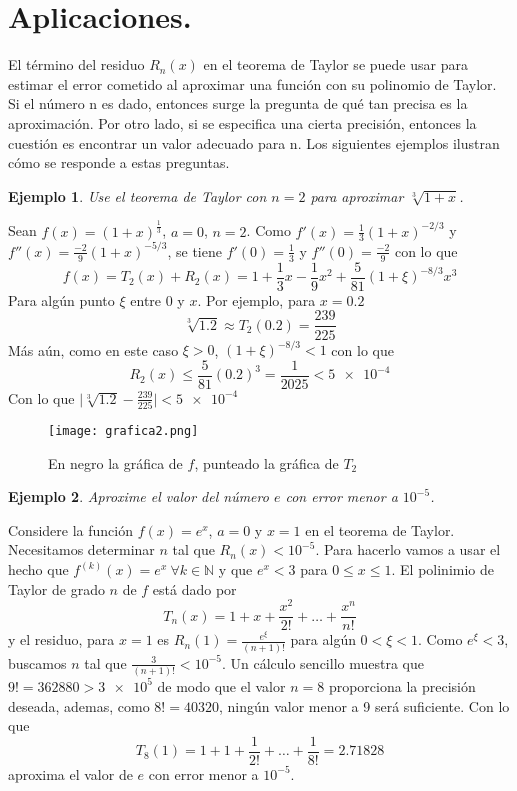 \documentclass[12pt]{book}
\newcommand\N{{\mathbb N}}
\providecommand{\abs}[1]{\lvert#1\rvert}
\newtheorem{ejem}{Ejemplo}[section]
\begin{document}
\section{Aplicaciones.}
El término del residuo $R_n(x)$ en el teorema de Taylor se puede usar para estimar el error cometido al aproximar una función con su polinomio de Taylor. Si el número n es dado, entonces surge la pregunta de qué tan precisa es la aproximación. Por otro lado, si se especifica una cierta precisión, entonces la cuestión es encontrar un valor adecuado para n. Los siguientes ejemplos ilustran cómo se responde a estas preguntas.
\begin{ejem}\rm
Use el teorema de Taylor con $n=2$ para aproximar $\sqrt[3]{1+x}$. 
\end{ejem}
Sean $f(x)=(1+x)^{\frac{1}{3}}$, $a=0$, $n=2$.
Como $f'(x)=\frac{1}{3}(1+x)^{-2/3}$ y $f''(x)=\frac{-2}{9}(1+x)^{-5/3}$, se tiene $f'(0)=\frac{1}{3}$ y $f''(0)=\frac{-2}{9}$ con lo que $$f(x)=T_2(x)+R_2(x)=1+\frac{1}{3}x-\frac{1}{9}x^2+\frac{5}{81}(1+\xi)^{-8/3}x^3$$
Para algún punto $\xi$ entre 0 y $x$. Por ejemplo, para $x=0.2$ $$\sqrt[3]{1.2} \approx T_2(0.2)=\frac{239}{225}$$
Más aún, como en este caso $\xi>0$, $(1+\xi)^{-8/3}<1$ con lo que $$R_2(x) \le \frac{5}{81}(0.2)^3=\frac{1}{2025}<\num{5e-4}$$
Con lo que $\abs{\sqrt[3]{1.2}-\frac{239}{225}}<\num{5e-4}$
\begin{figure}[htp]
    \centering
    \texttt{[image: grafica2.png]}
    \caption{En negro la gráfica de $f$, punteado la gráfica de $T_2$}
\end{figure}
\begin{ejem}\rm
Aproxime el valor del número $e$ con error menor a $10^{-5}$.
\end{ejem}
Considere la función $f(x)=e^x$, $a=0$ y $x=1$ en el teorema de Taylor. Necesitamos determinar $n$ tal que $R_n(x)<10^{-5}$. Para hacerlo vamos a usar el hecho que $f^{(k)}(x)=e^x \ \forall{k \in \N}$ y que $e^x<3$ para $0\le x \le 1$.
El polinimio de Taylor de grado $n$ de $f$ está dado por $$T_n(x)=1+x+\frac{x^2}{2!}+\dots+\frac{x^n}{n!}$$
y el residuo, para $x=1$ es $R_n(1)=\frac{e^{\xi}}{(n+1)!}$ para algún $0<\xi<1$.
Como $e^{\xi}<3$, buscamos $n$ tal que $\frac{3}{(n+1)!}<10^{-5}$. Un cálculo sencillo muestra que $9!=362880>\num{3e5}$ de modo que el valor $n=8$ proporciona la precisión deseada, ademas, como $8!=40320$, ningún valor menor a 9 será suficiente. Con lo que $$T_8(1)=1+1+\frac{1}{2!}+\dots+\frac{1}{8!}=2.71828$$ aproxima el valor de $e$ con error menor a $10^{-5}$.
\end{document}
